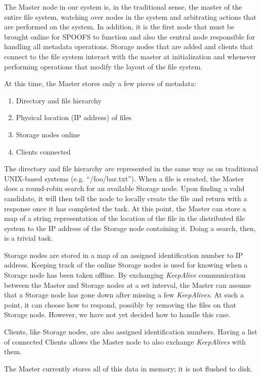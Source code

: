 The Master node in our system is, in the traditional sense, the master of the entire file system, watching over nodes in the system and arbitrating actions that are performed on the system. In addition, it is the first node that must be brought online for SPOOFS to function and also the central node responsible for handling all metadata operations. Storage nodes that are added and clients that connect to the file system interact with the master at initialization and whenever performing operations that modify the layout of the file system.

At this time, the Master stores only a few pieces of metadata:
\begin{enumerate}
\item Directory and file hierarchy
\item Physical location (IP address) of files
\item Storage nodes online
\item Clients connected
\end{enumerate}
The directory and file hierarchy are represented in the same way as on traditional UNIX-based systems (e.g. ``/foo/bar.txt''). When a file is created, the Master does a round-robin search for an available Storage node. Upon finding a valid candidate, it will then tell the node to locally create the file and return with a response once it has completed the task. At this point, the Master can store a map of a string representation of the location of the file in the distributed file system to the IP address of the Storage node containing it. Doing a search, then, is a trivial task.

Storage nodes are stored in a map of an assigned identification number to IP address. Keeping track of the online Storage nodes is used for knowing when a Storage node has been taken offline. By exchanging \textit{KeepAlive} communication between the Master and Storage nodes at a set interval, the Master can assume that a Storage node has gone down after missing a few \textit{KeepAlives}. At such a point, it can choose how to respond, possibly by removing the files on that Storage node. However, we have not yet decided how to handle this case.

Clients, like Storage nodes, are also assigned identification numbers. Having a list of connected Clients allows the Master node to also exchange \textit{KeepAlives} with them. 

The Master currently stores all of this data in memory; it is not flushed to disk. 


